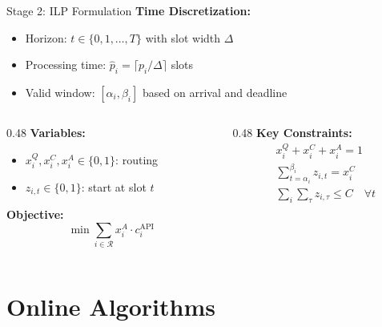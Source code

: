 \documentclass[aspectratio=169,10pt]{beamer}
\begin{document}
\begin{frame}{Stage 2: ILP Formulation}
\textbf{Time Discretization:}
\begin{itemize}
    \item Horizon: $t \in \{0, 1, \ldots, T\}$ with slot width $\Delta$
    \item Processing time: $\hat{p}_i = \lceil p_i / \Delta \rceil$ slots
    \item Valid window: $[\alpha_i, \beta_i]$ based on arrival and deadline
\end{itemize}

\vspace{0.3cm}
\begin{columns}[T]
\begin{column}{0.48\textwidth}
\textbf{Variables:}
\begin{itemize}
    \item $x_i^Q, x_i^C, x_i^A \in \{0,1\}$: routing
    \item $z_{i,t} \in \{0,1\}$: start at slot $t$
\end{itemize}

\vspace{0.2cm}
\textbf{Objective:}
\begin{equation*}
\min \sum_{i \in \mathcal{R}} x_i^A \cdot c_i^{\text{API}}
\end{equation*}
\end{column}

\begin{column}{0.48\textwidth}
\textbf{Key Constraints:}
\begin{align*}
&x_i^Q + x_i^C + x_i^A = 1 \\[0.2cm]
&\sum_{t=\alpha_i}^{\beta_i} z_{i,t} = x_i^C \\[0.2cm]
&\sum_i \sum_{\tau} z_{i,\tau} \leq C \quad \forall t
\end{align*}
\end{column}
\end{columns}
\end{frame}

\section{Online Algorithms}
\end{document}
